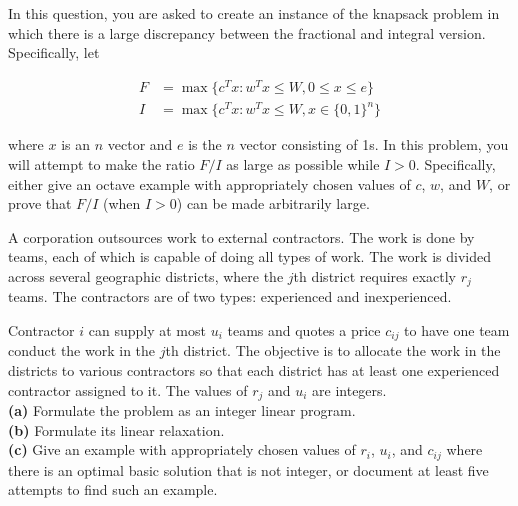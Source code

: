 \documentclass[fleqn]{homework}
\begin{document}
  \begin{problem}{6}
    \begin{question}
      In this question, you are asked to create an instance of the knapsack
      problem in which there is a large discrepancy between the fractional and
      integral version.  Specifically, let

      \begin{align*}
        F &= \max \{c^T x: w^T x \leq W, 0 \leq x \leq e\}\\
        I &= \max \{c^T x: w^T x \leq W, x\in\{0,1\}^n\}
      \end{align*}

      where $x$ is an $n$ vector and $e$ is the $n$ vector consisting of 1s.  In
      this problem, you will attempt to make the ratio $F/I$ as large as
      possible while $I>0$.  Specifically, either give an octave example with
      appropriately chosen values of $c$, $w$, and $W$, or prove that $F/I$
      (when $I>0$) can be made arbitrarily large.
    \end{question}
  \end{problem}

  \begin{problem}{7}
    \begin{question}
      A corporation outsources work to external contractors.  The work is done
      by teams, each of which is capable of doing all types of work.  The work
      is divided across several geographic districts, where the $j$th district
      requires exactly $r_j$ teams.  The contractors are of two types:
      experienced and inexperienced.

      Contractor $i$ can supply at most $u_i$ teams and quotes a price $c_{ij}$
      to have one team conduct the work in the $j$th district.  The objective is
      to allocate the work in the districts to various contractors so that each
      district has at least one experienced contractor assigned to it.  The
      values of $r_j$ and $u_i$ are integers.\\
      \textbf{(a)} Formulate the problem as an integer linear program.\\
      \textbf{(b)} Formulate its linear relaxation.\\
      \textbf{(c)} Give an example with appropriately chosen values of $r_i$,
    $u_i$, and $c_{ij}$ where there is an optimal basic solution that is not
    integer, or document at least five attempts to find such an example.
    \end{question}
  \end{problem}
\end{document}
